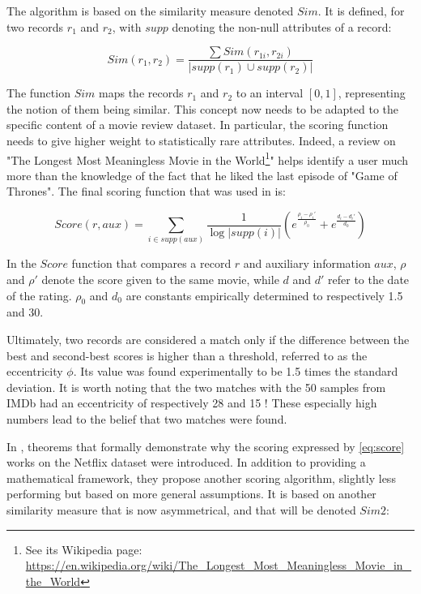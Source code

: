 The algorithm is based on the similarity measure denoted $Sim$. It is defined, for two records $r_1$ and $r_2$, with $supp$ denoting the non-null attributes of a record:

\begin{equation}
	Sim(r_1, r_2) = \frac{\sum Sim(r_{1i}, r_{2i})}{\lvert supp(r_1) \cup supp(r_2) \rvert}
\end{equation} 

The function $Sim$ maps the records $r_1$ and $r_2$ to an interval $[0,1]$, representing the notion of them being similar. This concept now needs to be adapted to the specific content of a movie review dataset. In particular, the scoring function needs to give higher weight to statistically rare attributes. Indeed, a review on "The Longest Most Meaningless Movie in the World\footnote{See its Wikipedia page: \url{https://en.wikipedia.org/wiki/The_Longest_Most_Meaningless_Movie_in_the_World}}" helps identify a user much more than the knowledge of the fact that he liked the last episode of "Game of Thrones". The final scoring function that was used in \cite{netflix} is:

\begin{equation}\label{eq:score}
	Score(r,aux) = \sum_{i \in supp(aux)} \frac{1}{\log\lvert supp(i) \rvert} \left( e^{\frac{\rho_i - \rho_i' }{\rho_0}} + e^{\frac{d_i - d_i' }{d_0}}\right)
\end{equation}

In the $Score$ function that compares a record $r$ and auxiliary information $aux$, $\rho$ and $\rho'$ denote the score given to the same movie, while $d$ and $d'$ refer to the date of the rating. $\rho_0$ and $d_0$ are constants empirically determined to respectively 1.5 and 30.

Ultimately, two records are considered a match only if the difference between the best and second-best scores is higher than a threshold, referred to as the eccentricity $\phi$. Its value was found experimentally to be 1.5 times the standard deviation. It is worth noting that the two matches with the 50 samples from IMDb had an eccentricity of respectively 28 and 15 ! These especially high numbers lead to the belief that two matches were found.
 
In \cite{netflix-analytic}, theorems that formally demonstrate why the scoring expressed by \autoref{eq:score} works on the Netflix dataset were introduced. In addition to providing a mathematical framework, they propose another scoring algorithm, slightly less performing but based on more general assumptions. It is based on another similarity measure that is now asymmetrical, and that will be denoted $Sim2$: 

